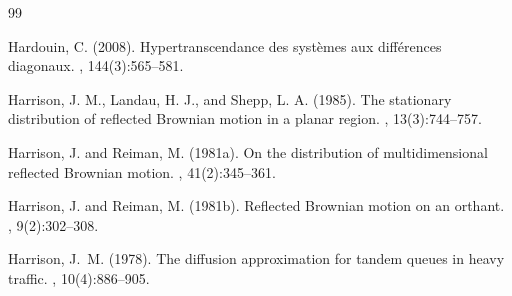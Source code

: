 \documentclass[11pt]{article}
\theoremstyle{definition}
\begin{document}
\begin{thebibliography}{99}






Hardouin, C. (2008).
\newblock Hypertranscendance des systèmes aux différences diagonaux.
, 144(3):565--581.

Harrison, J. M., Landau, H. J., and Shepp, L. A. (1985).
\newblock The stationary distribution of reflected Brownian motion in a planar region.
, 13(3):744--757.

Harrison, J. and Reiman, M. (1981a).
\newblock On the distribution of multidimensional reflected {B}rownian motion.
, 41(2):345--361.

Harrison, J. and Reiman, M. (1981b).
\newblock Reflected {B}rownian motion on an orthant.
, 9(2):302--308.

Harrison, J.~M. (1978).
\newblock The diffusion approximation for tandem queues in heavy traffic.
, 10(4):886--905.


\end{thebibliography}
\end{document}
